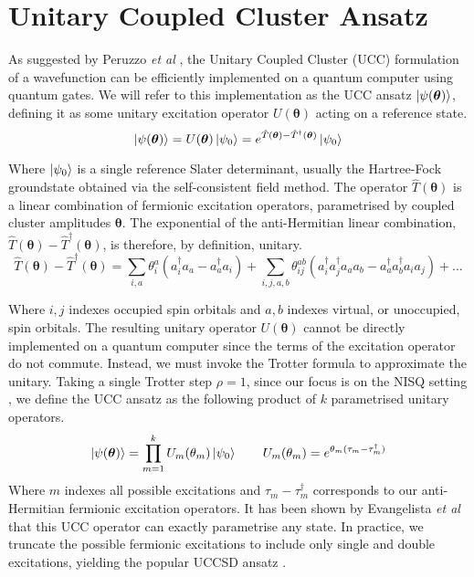 \section{Unitary Coupled Cluster Ansatz}%
\label{unitary-coupled-cluster-ansatz}

As suggested by Peruzzo \textit{et al} \cite{Peruzzo2014}, the Unitary Coupled Cluster (UCC) formulation of a wavefunction can be efficiently implemented on a quantum computer using quantum gates. We will refer to this implementation as the UCC ansatz $\ket{\psi(\bm\theta)}$, defining it as some unitary excitation operator $U(\bm\theta)$ acting on a reference state.
\begin{equation*}
    \ket{\psi(\bm\theta)} = U(\bm\theta) \ket{\psi_0} =
    e^{\hat T(\bm\theta) - \hat T^\dagger(\bm\theta)} \ket{\psi_0}
\end{equation*}

Where $\ket{\psi_0}$ is a single reference Slater determinant, usually the Hartree-Fock groundstate obtained via the self-consistent field method. The operator $\hat T(\bm\theta)$ is a linear combination of fermionic excitation operators, parametrised by coupled cluster amplitudes $\bm\theta$. The exponential of the anti-Hermitian linear combination, $\hat T(\bm\theta) - \hat T^\dagger(\bm\theta)$, is therefore, by definition, unitary. 
\begin{equation*}
\hat T(\bm{\theta}) - \hat T^{\dagger}(\bm{\theta}) =
\sum_{i, a} \theta^a_i (a^\dagger_i a_a - a^\dagger_a a_i) + 
\sum_{i, j, a, b} \theta^{ab}_{ij} (a^\dagger_i a^\dagger_j a_a a_b - a^\dagger_a a^\dagger_b a_i a_j) + \dots
\end{equation*}

Where $i, j$ indexes occupied spin orbitals and $a, b$ indexes virtual, or unoccupied, spin orbitals. The resulting unitary operator $U(\bm\theta)$ cannot be directly implemented on a quantum computer since the terms of the excitation operator do not commute. Instead, we must invoke the Trotter formula to approximate the unitary. Taking a single Trotter step $\rho=1$, since our focus is on the NISQ setting \cite{Cowtan2020}, we define the UCC ansatz as the following product of $k$ parametrised unitary operators.
\begin{equation*}
    \ket{\psi(\bm\theta)} = \prod_{m=1}^k U_m(\theta_m) \ket{\psi_0} \qquad
    U_m(\theta_m) = e^{\theta_m (\tau_m - \tau_m^\dagger)}
\end{equation*}
Where $m$ indexes all possible excitations and $\tau_m - \tau_m^\dagger$ corresponds to our anti-Hermitian fermionic excitation operators. It has been shown by Evangelista \textit{et al} \cite{Evangelista2019} that this UCC operator can exactly parametrise any state. In practice, we truncate the possible fermionic excitations to include only single and double excitations, yielding the popular UCCSD ansatz \cite{Chan2021}.

